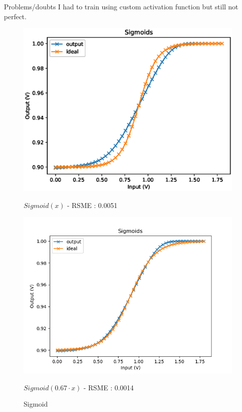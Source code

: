 \documentclass[table]{beamer}
\begin{document}
  \begin{frame}{Problems/doubts}
    I had to train using custom activation function but still not perfect.
    \begin{figure}[!tbp]
      \centering
      \begin{minipage}[b]{0.4\textwidth}
        \centering
        \includegraphics[width=\textwidth]{activation/sigmoid}
        \caption{ $Sigmoid(x)$ - RSME : 0.0051}
      \end{minipage}
      \hspace{20pt}
      \begin{minipage}[b]{0.4\textwidth}
        \centering
        \includegraphics[width=\textwidth]{activation/cSigmoid}
        \caption{ $ Sigmoid(0.67\cdot x) $ - RSME : 0.0014}
      \end{minipage}
      \caption{Sigmoid}
    \end{figure}
  \end{frame}
\end{document}
